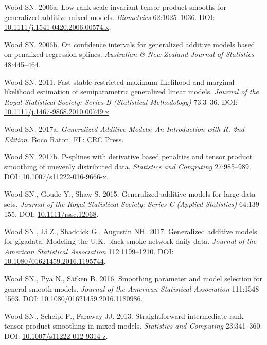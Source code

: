 \documentclass[12pt]{article}
\begin{document}
\hypertarget{ref-wood_lowrank_2006}{}
Wood SN. 2006a. Low-rank scale-invariant tensor product smooths for
generalized additive mixed models. \emph{Biometrics} 62:1025--1036. DOI:
\href{https://doi.org/10.1111/j.1541-0420.2006.00574.x}{10.1111/j.1541-0420.2006.00574.x}.

\hypertarget{ref-wood_confidence_2006}{}
Wood SN. 2006b. On confidence intervals for generalized additive models
based on penalized regression splines. \emph{Australian \& New Zealand
Journal of Statistics} 48:445--464.

\hypertarget{ref-wood_fast_2011}{}
Wood SN. 2011. Fast stable restricted maximum likelihood and marginal
likelihood estimation of semiparametric generalized linear models.
\emph{Journal of the Royal Statistical Society: Series B (Statistical
Methodology)} 73:3--36. DOI:
\href{https://doi.org/10.1111/j.1467-9868.2010.00749.x}{10.1111/j.1467-9868.2010.00749.x}.

\hypertarget{ref-wood_generalized_2017}{}
Wood SN. 2017a. \emph{Generalized Additive Models: An Introduction with
R, 2nd Edition}. Boco Raton, FL: CRC Press.

\hypertarget{ref-wood_p_splines_2017}{}
Wood SN. 2017b. P-splines with derivative based penalties and tensor
product smoothing of unevenly distributed data. \emph{Statistics and
Computing} 27:985--989. DOI:
\href{https://doi.org/10.1007/s11222-016-9666-x}{10.1007/s11222-016-9666-x}.

\hypertarget{ref-wood_generalized_2015}{}
Wood SN., Goude Y., Shaw S. 2015. Generalized additive models for large
data sets. \emph{Journal of the Royal Statistical Society: Series C
(Applied Statistics)} 64:139--155. DOI:
\href{https://doi.org/10.1111/rssc.12068}{10.1111/rssc.12068}.

\hypertarget{ref-Wood2017-iy}{}
Wood SN., Li Z., Shaddick G., Augustin NH. 2017. Generalized additive
models for gigadata: Modeling the U.K. black smoke network daily data.
\emph{Journal of the American Statistical Association} 112:1199--1210.
DOI:
\href{https://doi.org/10.1080/01621459.2016.1195744}{10.1080/01621459.2016.1195744}.

\hypertarget{ref-wood_smoothing_2016}{}
Wood SN., Pya N., Säfken B. 2016. Smoothing parameter and model
selection for general smooth models. \emph{Journal of the American
Statistical Association} 111:1548--1563. DOI:
\href{https://doi.org/10.1080/01621459.2016.1180986}{10.1080/01621459.2016.1180986}.

\hypertarget{ref-wood_straightforward_2012}{}
Wood SN., Scheipl F., Faraway JJ. 2013. Straightforward intermediate
rank tensor product smoothing in mixed models. \emph{Statistics and
Computing} 23:341--360. DOI:
\href{https://doi.org/10.1007/s11222-012-9314-z}{10.1007/s11222-012-9314-z}.
\end{document}
